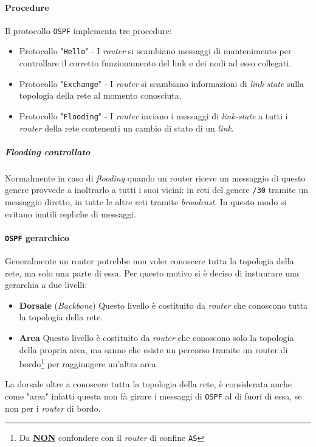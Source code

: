             \paragraph{Procedure} Il protocollo \texttt{OSPF} implementa tre procedure: \begin{itemize}
                \item Protocollo "\texttt{Hello}" - I \textit{router} si scambiano messaggi di mantenimento per controllare il corretto funzionamento del link e dei nodi ad esso collegati.
                \item Protocollo "\texttt{Exchange}" - I \textit{router} si scambiano informazioni di \textit{link-state} sulla topologia della rete al momento conosciuta.
                \item Protocollo "\texttt{Flooding}" - I \textit{router} inviano i messaggi di \textit{link-state} a tutti i \textit{router} della rete contenenti un cambio di stato di un \textit{link}.
            \end{itemize}
            \subparagraph{\textit{Flooding} controllato} Normalmente in caso di \textit{flooding} quando un router riceve un messaggio di questo genere provvede a inoltrarlo a tutti i suoi vicini: in reti del genere \texttt{/30} tramite un messaggio diretto, in tutte le altre reti tramite \textit{broadcast}. In questo modo si evitano inutili repliche di messaggi.
        \paragraph{\texttt{OSPF} gerarchico} Generalmente un router potrebbe non voler conoscere tutta la topologia della rete, ma solo una parte di essa. Per questo motivo si è deciso di instaurare una gerarchia a due livelli: \begin{itemize}
            \item \textbf{Dorsale} (\textit{Backbone}) Questo livello è costituito da \textit{router} che conoscono tutta la topologia della rete.
            \item \textbf{Area} Questo livello è costituito da \textit{router} che conoscono solo la topologia della propria area, ma sanno che esiste un percorso tramite un router di bordo\footnote{Da \underline{\textbf{NON}} confondere con il \textit{router} di confine \texttt{AS}} per raggiungere un'altra area.
        \end{itemize}
        La dorsale oltre a conoscere tutta la topologia della rete, è considerata anche come "area" infatti questa non fà girare i messaggi di \texttt{OSPF} al di fuori di essa, se non per i \textit{router} di bordo.

